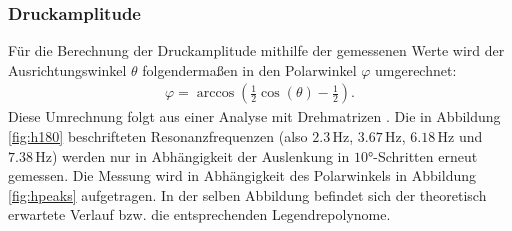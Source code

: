 \subsubsection{Druckamplitude}
Für die Berechnung der Druckamplitude mithilfe der gemessenen Werte wird der Ausrichtungswinkel $\theta$ folgendermaßen in den Polarwinkel $\varphi$ umgerechnet:
\begin{align*}
  \varphi = \arccos(\frac{1}{2} \cos(\theta) - \frac{1}{2}).
\end{align*}
Diese Umrechnung folgt aus einer Analyse mit Drehmatrizen \cite{qa-dresden}. Die in Abbildung \ref{fig:h180} beschrifteten Resonanzfrequenzen (also $2.3 \,\si{\hertz}$, $3.67 \,\si{\hertz}$, $6.18 \,\si{\hertz}$ und $7.38 \,\si{\hertz}$) werden nur in Abhängigkeit der Auslenkung in $10°$-Schritten erneut gemessen. 
Die Messung wird in Abhängigkeit des Polarwinkels in Abbildung \ref{fig:hpeaks} aufgetragen. In der selben Abbildung befindet sich der theoretisch erwartete Verlauf bzw. die entsprechenden Legendrepolynome. 
